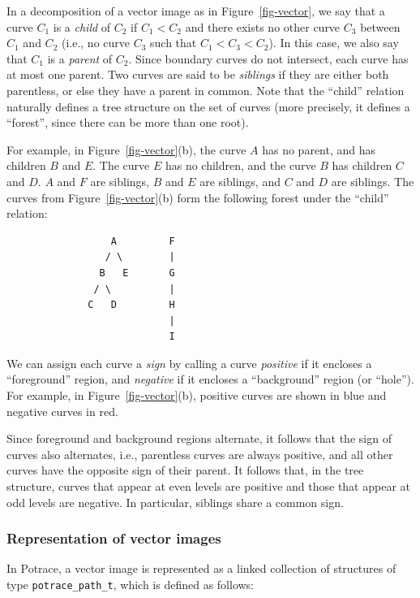 \documentclass{article}
\begin{document}
In a decomposition of a vector image as in Figure~\ref{fig-vector}, we
say that a curve $C_1$ is a {\em child} of $C_2$ if $C_1 < C_2$ and
there exists no other curve $C_3$ between $C_1$ and $C_2$ (i.e., no
curve $C_3$ such that $C_1 < C_3 < C_2$). In this case, we also say
that $C_1$ is a {\em parent} of $C_2$. Since boundary curves do not
intersect, each curve has at most one parent.  Two curves are said to
be {\em siblings} if they are either both parentless, or else they
have a parent in common. Note that the ``child'' relation naturally
defines a tree structure on the set of curves (more precisely, it
defines a ``forest'', since there can be more than one root).

For example, in Figure~\ref{fig-vector}(b), the curve $A$ has no
parent, and has children $B$ and $E$. The curve $E$ has no children,
and the curve $B$ has children $C$ and $D$. $A$ and $F$ are siblings,
$B$ and $E$ are siblings, and $C$ and $D$ are siblings. The curves
from Figure~\ref{fig-vector}(b) form the following forest under the
``child'' relation:

\begin{verbatim}
                  A         F
                 / \        |
                B   E       G
               / \          |
              C   D         H
                            |
                            I
\end{verbatim}

We can assign each curve a {\em sign} by calling a curve {\em
  positive} if it encloses a ``foreground'' region, and {\em negative}
if it encloses a ``background'' region (or ``hole''). For example, in
Figure~\ref{fig-vector}(b), positive curves are shown in blue and
negative curves in red.

Since foreground and background regions alternate, it follows that the
sign of curves also alternates, i.e., parentless curves are always
positive, and all other curves have the opposite sign of their parent.
It follows that, in the tree structure, curves that appear at even
levels are positive and those that appear at odd levels are negative.
In particular, siblings share a common sign.

\subsubsection{Representation of vector images}\label{sssec-vector}

In Potrace, a vector image is represented as a linked collection of
structures of type \verb!potrace_path_t!, which is defined as follows:
\end{document}
